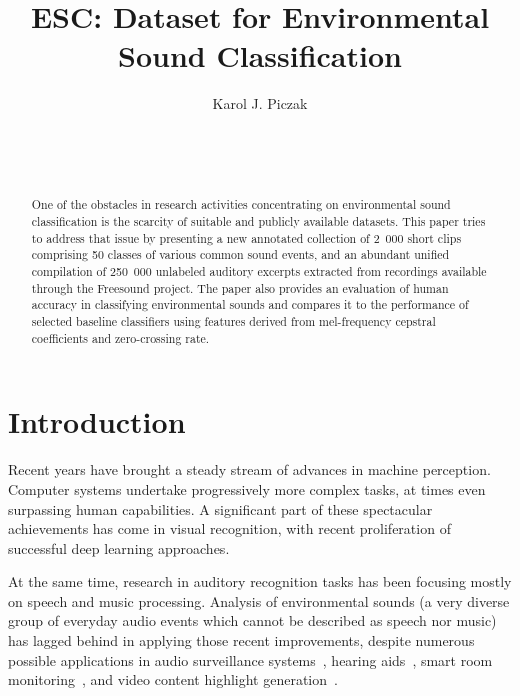 \documentclass[letterpaper]{sig-alternate}
\begin{document}
\renewcommand{\footnotesize}{\fontsize{7pt}{9pt}\selectfont}
\setlength\footnotemargin{8pt}

\title{ESC: Dataset for Environmental Sound Classification}

\author{
\alignauthor
Karol J. Piczak\\
       \\
       \\
       \\
}

\maketitle
\begin{abstract}
One of the obstacles in research activities concentrating on environmental sound classification is the scarcity of suitable and publicly available datasets. This paper tries to address that issue by presenting a new annotated collection of 2~000 short clips comprising 50 classes of various common sound events, and an abundant unified compilation of 250~000 unlabeled auditory excerpts extracted from recordings available through the Freesound project. The paper also provides an evaluation of human accuracy in classifying environmental sounds and compares it to the performance of selected baseline classifiers using features derived from mel-frequency cepstral coefficients and zero-crossing rate.
\end{abstract}



\section{Introduction}
Recent years have brought a steady stream of advances in machine perception. Computer systems undertake progressively more complex tasks, at times even surpassing human capabilities. A significant part of these spectacular achievements has come in visual recognition, with recent proliferation of successful deep learning approaches.

At the same time, research in auditory recognition tasks has been focusing mostly on speech and music processing. Analysis of environmental sounds (a very diverse group of everyday audio events which cannot be described as speech nor music) has lagged behind in applying those recent improvements, despite numerous possible applications in audio surveillance systems~\cite{lopatka2010dangerous}, hearing aids~\cite{alexandre2007feature}, smart room monitoring~\cite{vacher2007sound}, and video content highlight generation~\cite{ballan2009deep}.
\end{document}
